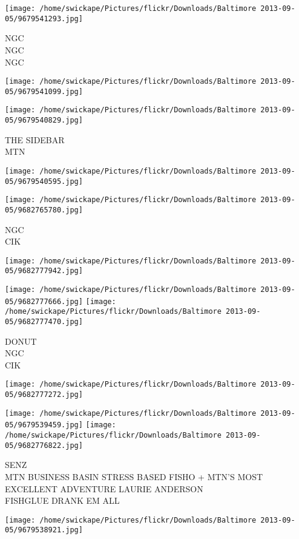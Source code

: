 \documentclass[10pt,letterpaper]{article}
\begin{document}
\texttt{[image: /home/swickape/Pictures/flickr/Downloads/Baltimore 2013-09-05/9679541293.jpg]}

NGC\\
NGC\\
NGC
\pagebreak

\texttt{[image: /home/swickape/Pictures/flickr/Downloads/Baltimore 2013-09-05/9679541099.jpg]}

\vspace{0.25in}
\texttt{[image: /home/swickape/Pictures/flickr/Downloads/Baltimore 2013-09-05/9679540829.jpg]}

THE SIDEBAR\\
MTN
\pagebreak

\texttt{[image: /home/swickape/Pictures/flickr/Downloads/Baltimore 2013-09-05/9679540595.jpg]}

\vspace{0.25in}
\texttt{[image: /home/swickape/Pictures/flickr/Downloads/Baltimore 2013-09-05/9682765780.jpg]}

NGC\\
CIK
\pagebreak

\texttt{[image: /home/swickape/Pictures/flickr/Downloads/Baltimore 2013-09-05/9682777942.jpg]}

\vspace{0.25in}
\texttt{[image: /home/swickape/Pictures/flickr/Downloads/Baltimore 2013-09-05/9682777666.jpg]}
\texttt{[image: /home/swickape/Pictures/flickr/Downloads/Baltimore 2013-09-05/9682777470.jpg]}

DONUT\\
NGC\\
CIK
\pagebreak

\texttt{[image: /home/swickape/Pictures/flickr/Downloads/Baltimore 2013-09-05/9682777272.jpg]}

\vspace{0.25in}
\texttt{[image: /home/swickape/Pictures/flickr/Downloads/Baltimore 2013-09-05/9679539459.jpg]}
\texttt{[image: /home/swickape/Pictures/flickr/Downloads/Baltimore 2013-09-05/9682776822.jpg]}

SENZ\\
MTN BUSINESS BASIN STRESS BASED FISHO + MTN'S MOST EXCELLENT ADVENTURE LAURIE ANDERSON\\
FISHGLUE DRANK EM ALL
\pagebreak

\texttt{[image: /home/swickape/Pictures/flickr/Downloads/Baltimore 2013-09-05/9679538921.jpg]}
\end{document}
